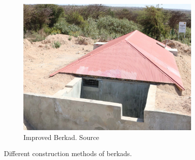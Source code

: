 \begin{figure}[!hbp]
\begin{subfigure}[t]{0.3\linewidth}
        \centering\includegraphics[width=0.95\linewidth]{figures/2023_MA_th_berkad_improved.png}
        \caption{Improved Berkad. Source \textcite{thepharofoundationImprovedBerkad2020}}
    \end{subfigure}
    \label{fig:th_berkads}
    \caption{Different construction methods of berkads.}
\end{figure}



